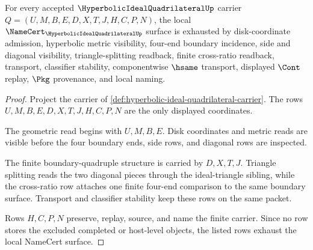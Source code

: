 \begin{theorem}
\label{thm:hyperbolic-ideal-quadrilateral-namecert-obligations}
For every accepted $\HyperbolicIdealQuadrilateralUp$ carrier $Q=(U,M,B,E,D,X,T,J,H,C,P,N)$, the local $\NameCert_{\HyperbolicIdealQuadrilateralUp}$ surface is exhausted by disk-coordinate admission, hyperbolic metric visibility, four-end boundary incidence, side and diagonal visibility, triangle-splitting readback, finite cross-ratio readback, transport, classifier stability, componentwise $\hsame$ transport, displayed $\Cont$ replay, $\Pkg$ provenance, and local naming.
\end{theorem}
\begin{proof}
Project the carrier of \autoref{def:hyperbolic-ideal-quadrilateral-carrier}. The rows $U,M,B,E,D,X,T,J,H,C,P,N$ are the only displayed coordinates.

The geometric read begins with $U,M,B,E$. Disk coordinates and metric reads are visible before the four boundary ends, side rows, and diagonal rows are inspected.

The finite boundary-quadruple structure is carried by $D,X,T,J$. Triangle splitting reads the two diagonal pieces through the ideal-triangle sibling, while the cross-ratio row attaches one finite four-end comparison to the same boundary surface. Transport and classifier stability keep these rows on the same packet.

Rows $H,C,P,N$ preserve, replay, source, and name the finite carrier. Since no row stores the excluded completed or host-level objects, the listed rows exhaust the local NameCert surface.
\end{proof}

